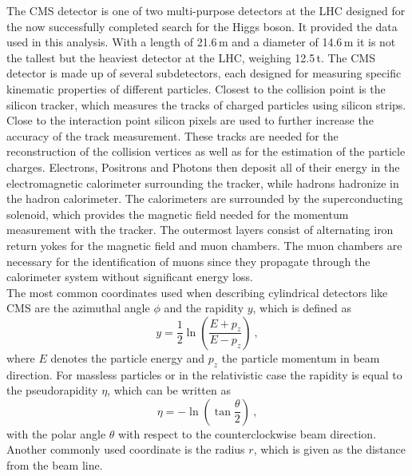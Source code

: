The CMS detector is one of two multi-purpose detectors at the LHC designed for the now successfully completed search for the Higgs boson. It provided the data used in this analysis. With a length of 21.6\,m and a diameter of 14.6\,m it is not the tallest but the heaviest detector at the LHC, weighing 12.5\,t. The CMS detector is made up of several subdetectors, each designed for measuring specific kinematic properties of different particles. Closest to the collision point is the silicon tracker, which measures the tracks of charged particles using silicon strips. Close to the interaction point silicon pixels are used to further increase the accuracy of the track measurement. These tracks are needed for the reconstruction of the collision vertices as well as for the estimation of the particle charges. Electrons, Positrons and Photons then deposit all of their energy in the electromagnetic calorimeter surrounding the tracker, while hadrons hadronize in the hadron calorimeter. The calorimeters are surrounded by the superconducting solenoid, which provides the magnetic field needed for the momentum measurement with the tracker. The outermost layers consist of alternating iron return yokes for the magnetic field and muon chambers. The muon chambers are necessary for the identification of muons since they propagate through the calorimeter system without significant energy loss.\\

\noindent The most common coordinates used when describing cylindrical detectors like CMS are the azimuthal angle $\phi$ and the rapidity $y$, which is defined as
\begin{equation}
y = \frac{1}{2} \ln \left( \frac{E+p_z}{E-p_z} \right) ~,
\end{equation}
where $E$ denotes the particle energy and $p_z$ the particle momentum in beam direction. For massless particles or in the relativistic case the rapidity is equal to the pseudorapidity $\eta$, which can be written as
\begin{equation}
\eta = -\ln \left( \tan \frac{\theta}{2} \right) ~,
\end{equation}
with the polar angle $\theta$ with respect to the counterclockwise beam direction. Another commonly used coordinate is the radius $r$, which is given as the distance from the beam line.\\

